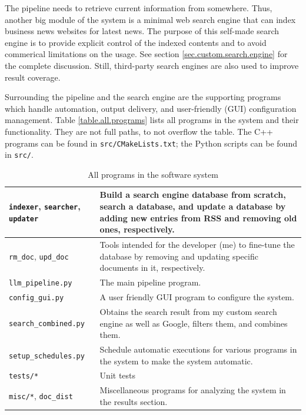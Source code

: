 \documentclass[final-report]{report-template}
\newcommand\ttb{\discretionary{}{}{}}
\begin{document}
The pipeline needs to retrieve current information from somewhere. Thus,
another big module of the system is a minimal web search engine that can index
business news websites for latest news. The purpose of this self-made search
engine is to provide explicit control of the indexed contents and to avoid
commerical limitations on the usage. See section \ref{sec.custom.search.engine}
for the complete discussion. Still, third-party search engines are also used to
improve result coverage.

Surrounding the pipeline and the search engine are the supporting programs
which handle automation, output delivery, and user-friendly (GUI) configuration
management. Table \ref{table.all.programs} lists all programs in the system and
their functionality. They are not full paths, to not overflow the table. The
C++ programs can be found in \texttt{src/\ttb CMakeLists.\ttb txt}; the Python
scripts can be found in \texttt{src/}.
\begin{table}[hbtp!]
\centering
\begin{tabular}{|p{4cm}|p{10cm}|}
	\hline
	\verb!indexer!, \verb!searcher!, \verb!updater! &
	Build a search engine database from scratch, search a database, and update a
	database by adding new entries from RSS and removing old ones,
	respectively. 
	\\ \hline
	\verb!rm_doc!, \verb!upd_doc! &
	Tools intended for the developer (me) to fine-tune the database by removing
	and updating specific documents in it, respectively.
	\\ \hline
	\verb!llm_pipeline.py! & The main pipeline program. 
	\\ \hline
	\verb!config_gui.py! & A user friendly GUI program to configure the system.
	\\ \hline
	\verb!search_combined.py! & Obtains the search result from my custom
	search engine as well as Google, filters them, and combines them.
	\\ \hline
	\verb!setup_schedules.py! & Schedule automatic executions for various
	programs in the system to make the system automatic.
	\\ \hline
	\verb!tests/*! & Unit tests	
	\\ \hline
	\verb!misc/*!, \texttt{doc\_\ttb dist} & Miscellaneous programs for
	analyzing the system in the results section.
	\\ \hline
\end{tabular}
\caption{All programs in the software system}
\label{tab.all.programs}
\end{table}
\end{document}
